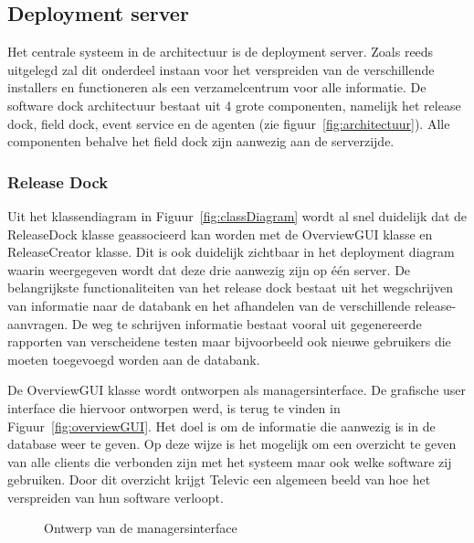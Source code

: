 \subsection{Deployment server}
Het centrale systeem in de architectuur is de deployment server.
Zoals reeds uitgelegd zal dit onderdeel instaan voor het verspreiden van de verschillende installers en functioneren als een verzamelcentrum voor alle informatie.
De software dock architectuur bestaat uit 4 grote componenten, namelijk het release dock, field dock, event service en de agenten (zie figuur~\ref{fig:architectuur}).
Alle componenten behalve het field dock zijn aanwezig aan de serverzijde.

\subsubsection{Release Dock}
Uit het klassendiagram in Figuur~\ref{fig:classDiagram} wordt al snel duidelijk dat de ReleaseDock klasse geassocieerd kan worden met de OverviewGUI klasse en ReleaseCreator klasse.
Dit is ook duidelijk zichtbaar in het deployment diagram waarin weergegeven wordt dat deze drie aanwezig zijn op één server.
De belangrijkste functionaliteiten van het release dock bestaat uit het wegschrijven van informatie naar de databank en het afhandelen van de verschillende release-aanvragen.
De weg te schrijven informatie bestaat vooral uit gegenereerde rapporten van verscheidene testen maar bijvoorbeeld ook nieuwe gebruikers die moeten toegevoegd worden aan de databank.

De OverviewGUI klasse wordt ontworpen als managersinterface.
De grafische user interface die hiervoor ontworpen werd, is terug te vinden in Figuur~\vref{fig:overviewGUI}.
Het doel is om de informatie die aanwezig is in de database weer te geven.
Op deze wijze is het mogelijk om een overzicht te geven van alle clients die verbonden zijn met het systeem maar ook welke software zij gebruiken.
Door dit overzicht krijgt Televic een algemeen beeld van hoe het verspreiden van hun software verloopt.

\begin{figure}[!ht]
\centering
{}
\caption{Ontwerp van de managersinterface}
\label{fig:overviewGUI}
\end{figure}

